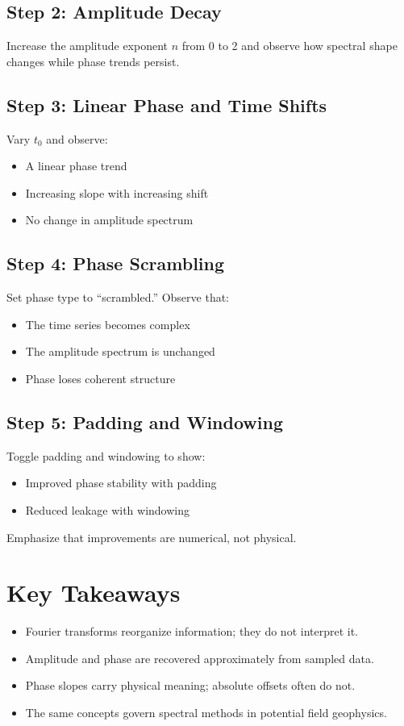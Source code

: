 \documentclass[11pt,a4paper]{article}
\begin{document}
\subsection*{Step 2: Amplitude Decay}
Increase the amplitude exponent $n$ from 0 to 2 and observe how spectral shape changes while phase trends persist.

\subsection*{Step 3: Linear Phase and Time Shifts}
Vary $t_0$ and observe:
\begin{itemize}
  \item A linear phase trend
  \item Increasing slope with increasing shift
  \item No change in amplitude spectrum
\end{itemize}

\subsection*{Step 4: Phase Scrambling}
Set phase type to ``scrambled.''
Observe that:
\begin{itemize}
  \item The time series becomes complex
  \item The amplitude spectrum is unchanged
  \item Phase loses coherent structure
\end{itemize}

\subsection*{Step 5: Padding and Windowing}
Toggle padding and windowing to show:
\begin{itemize}
  \item Improved phase stability with padding
  \item Reduced leakage with windowing
\end{itemize}

Emphasize that improvements are numerical, not physical.

\section{Key Takeaways}

\begin{itemize}
  \item Fourier transforms reorganize information; they do not interpret it.
  \item Amplitude and phase are recovered approximately from sampled data.
  \item Phase slopes carry physical meaning; absolute offsets often do not.
  \item The same concepts govern spectral methods in potential field geophysics.
\end{itemize}
\end{document}
